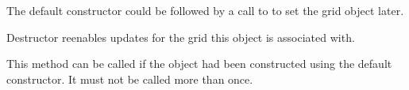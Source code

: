 The default constructor could be followed by a call to 
 to set the
grid object later.



\label{wxgridupdatelockerdtor}


Destructor reenables updates for the grid this object is associated with.



\label{wxgridupdatelockercreate}


This method can be called if the object had been constructed using the default
constructor. It must not be called more than once.


